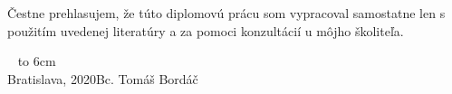 \documentclass[12pt, a4paper, oneside]{book}
\newcommand\mfauthor{Bc. Tomáš Bordáč}
\newcommand\thisYear{2020}
\newcommand\mfplacedate{Bratislava, \thisYear}
\begin{document}

\thispagestyle{empty}


\begin{figure}[H]
\begin{center}
\label{img:zadanie}
\end{center}
\end{figure}

{~}\vspace{12cm}

\noindent
\begin{minipage}{0.25\textwidth}~\end{minipage}
\begin{minipage}{0.75\textwidth}
Čestne prehlasujem, že túto diplomovú prácu som vypracoval samostatne len s použitím uvedenej literatúry a za pomoci konzultácií u môjho školiteľa.
\newline \newline
\end{minipage}
\vfill
~ \hfill {\hbox to 6cm{\dotfill}} \\
\mfplacedate \hfill \mfauthor
\vfill\eject 
\end{document}
